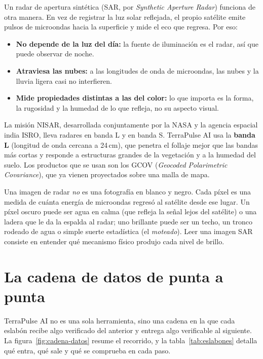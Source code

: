 \documentclass[11pt,a4paper]{article}
\begin{document}
Un radar de apertura sintética (SAR, por \emph{Synthetic Aperture Radar}) funciona de otra manera. En vez de
registrar la luz solar reflejada, el propio satélite emite pulsos de microondas hacia la superficie y mide el
eco que regresa. Por eso:
\begin{itemize}
  \item \textbf{No depende de la luz del día:} la fuente de iluminación es el radar, así que puede observar
        de noche.
  \item \textbf{Atraviesa las nubes:} a las longitudes de onda de microondas, las nubes y la lluvia ligera
        casi no interfieren.
  \item \textbf{Mide propiedades distintas a las del color:} lo que importa es la forma, la rugosidad y la
        humedad de lo que refleja, no su aspecto visual.
\end{itemize}
La misión NISAR, desarrollada conjuntamente por la NASA y la agencia espacial india ISRO, lleva radares en
banda L y en banda S. TerraPulse AI usa la \textbf{banda L} (longitud de onda cercana a 24\,cm), que penetra el
follaje mejor que las bandas más cortas y responde a estructuras grandes de la vegetación y a la humedad del
suelo. Los productos que se usan son los GCOV (\emph{Geocoded Polarimetric Covariance}), que ya vienen
proyectados sobre una malla de mapa.

\begin{intuicion}
Una imagen de radar \emph{no} es una fotografía en blanco y negro. Cada píxel es una medida de cuánta energía
de microondas regresó al satélite desde ese lugar. Un píxel oscuro puede ser agua en calma (que refleja la
señal lejos del satélite) o una ladera que le da la espalda al radar; uno brillante puede ser un techo, un
tronco rodeado de agua o simple suerte estadística (el \emph{moteado}). Leer una imagen SAR consiste en
entender qué mecanismo físico produjo cada nivel de brillo.
\end{intuicion}

\section{La cadena de datos de punta a punta}
\label{sec:cadena}

TerraPulse AI no es una sola herramienta, sino una cadena en la que cada eslabón recibe algo verificado del
anterior y entrega algo verificable al siguiente. La figura~\ref{fig:cadena-datos} resume el recorrido, y la
tabla~\ref{tab:eslabones} detalla qué entra, qué sale y qué se comprueba en cada paso.
\end{document}
